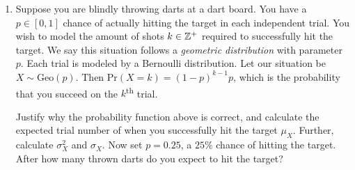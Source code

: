 \documentclass[main.tex]{subfiles}
\begin{document}
\begin{enumerate}
	\item Suppose you are blindly throwing darts at a dart board. You have a \(p \in [0,1]\) chance of actually hitting the target in each independent trial. You wish to model the amount of shots \(k \in \mathbb{Z}^+\) required to successfully hit the target. We say this situation follows a \textit{geometric distribution} with parameter \(p\). Each trial is modeled by a Bernoulli distribution. Let our situation be \(X \sim \text{Geo}(p)\). Then \(\mathrm{Pr}(X = k) = (1-p)^{k-1}p\), which is the probability that you succeed on the \(k\)\textsuperscript{th} trial.
	
	Justify why the probability function above is correct, and calculate the expected trial number of when you successfully hit the target \(\mu_X\). Further, calculate \(\sigma_X^2\) and \(\sigma_X\). Now set \(p=0.25\), a \(25\%\) chance of hitting the target. After how many thrown darts do you expect to hit the target?
\end{enumerate}
\end{document}
